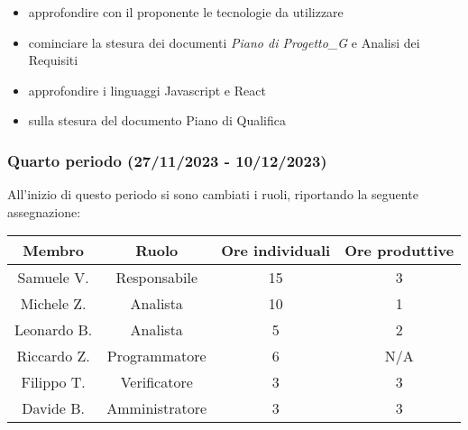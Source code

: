 \begin{itemize}
    \item approfondire con il proponente le tecnologie da utilizzare
    \item cominciare la stesura dei documenti \textit{Piano di Progetto_G} e Analisi dei Requisiti
    \item approfondire i linguaggi Javascript e React
\end{itemize}

\begin{itemize}
    \item sulla stesura del documento Piano di Qualifica
\end{itemize}

\subsubsection{Quarto periodo (27/11/2023 - 10/12/2023)}
All'inizio di questo periodo si sono cambiati i ruoli, riportando la seguente assegnazione:

\vspace{10 mm}
\begin{tabular}{|c|c|c|c|}
\hline
\textbf{Membro} & \textbf{Ruolo} & \textbf{Ore individuali} & \textbf{Ore produttive} \\
\hline
Samuele V. & Responsabile & 15 & 3 \\
\hline
Michele Z. & Analista & 10 & 1 \\
\hline
Leonardo B. & Analista & 5 & 2 \\
\hline
Riccardo Z. & Programmatore & 6 & N/A \\
\hline
Filippo T. & Verificatore & 3 & 3 \\
\hline
Davide B. & Amministratore & 3 & 3 \\
\hline
\end{tabular}
\vspace{10 mm}

